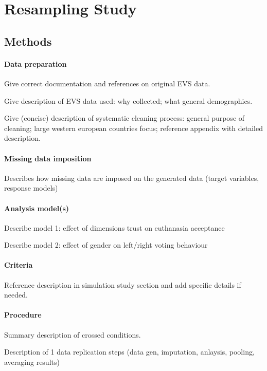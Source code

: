 \maketitle
\section{Resampling Study}

\subsection{Methods}

\paragraph{Data preparation}
	Give correct documentation and references on original EVS data.

	Give description of EVS data used: why collected; what general demographics.

	Give (concise) description of systematic cleaning process: general purpose of cleaning; 
	large western european countries focus; reference appendix with detailed description.

\paragraph{Missing data imposition}
	Describes how missing data are imposed on the generated data (target variables, response models)

\paragraph{Analysis model(s)}
	Describe model 1: effect of dimensions trust on euthanasia acceptance

	Describe model 2: effect of gender on left/right voting behaviour

\paragraph{Criteria}
	Reference description in simulation study section and add specific details if needed.

\paragraph{Procedure}
	Summary description of crossed conditions.

	Description of 1 data replication steps (data gen, imputation, anlaysis, pooling, averaging results)

